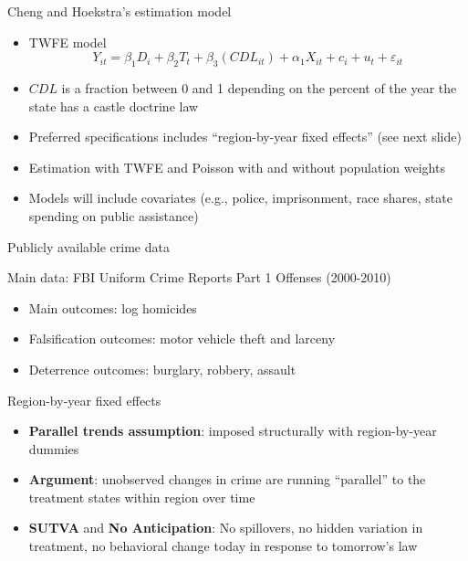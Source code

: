 \documentclass{beamer}
\begin{document}
\begin{frame}{Cheng and Hoekstra's estimation model}
	
	\begin{itemize}
	\item TWFE model$$Y_{it} = \beta_1 D_i + \beta_2 T_t + \beta_3 (CDL_{it}) + \alpha_1X_{it} + c_i + u_t + \varepsilon_{it}$$
	\item $CDL$ is a fraction between 0 and 1 depending on the percent of the year the state has a castle doctrine law 
	\item Preferred specifications includes ``region-by-year fixed effects'' (see next slide)
	\item Estimation with TWFE and Poisson with and without population weights
	\item Models will include covariates (e.g., police, imprisonment, race shares, state spending on public assistance)
	\end{itemize}
\end{frame}


\begin{frame}{Publicly available crime data}
	
Main data: FBI Uniform Crime Reports Part 1 Offenses (2000-2010)
		\begin{itemize}
		\item Main outcomes: log homicides
		\item Falsification outcomes: motor vehicle theft and larceny
		\item Deterrence outcomes: burglary, robbery, assault
		\end{itemize}
\end{frame}



\begin{frame}{Region-by-year fixed effects}
	
	\begin{itemize}
	\item \textbf{Parallel trends assumption}: imposed structurally with region-by-year dummies
	\item \textbf{Argument}: unobserved changes in crime are running ``parallel'' to the treatment states within region over time
	\item \textbf{SUTVA} and \textbf{No Anticipation}: No spillovers, no hidden variation in treatment, no behavioral change today in response to tomorrow's law
	\end{itemize}
\end{frame}
\end{document}
